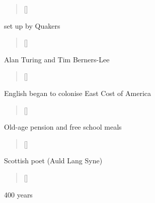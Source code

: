 \documentclass[grid,avery5371]{flashcards}
\begin{document}
\begin{flashcard}[]{%
\begin{verse}[\versewidth]
\end{verse}}

set up by Quakers

\end{flashcard}

\begin{flashcard}[]{%
\begin{verse}[\versewidth]
\end{verse}}

Alan Turing and Tim Berners-Lee

\end{flashcard}

\begin{flashcard}[]{%
\begin{verse}[\versewidth]
\end{verse}}

English began to colonise East Cost of America

\end{flashcard}

\begin{flashcard}[]{%
\begin{verse}[\versewidth]
\end{verse}}

Old-age pension and free school meals

\end{flashcard}

\begin{flashcard}[]{%
\begin{verse}[\versewidth]
\end{verse}}

Scottish poet (Auld Lang Syne)

\end{flashcard}

\begin{flashcard}[]{%
\begin{verse}[\versewidth]
\end{verse}}

400 years

\end{flashcard}
\end{document}
